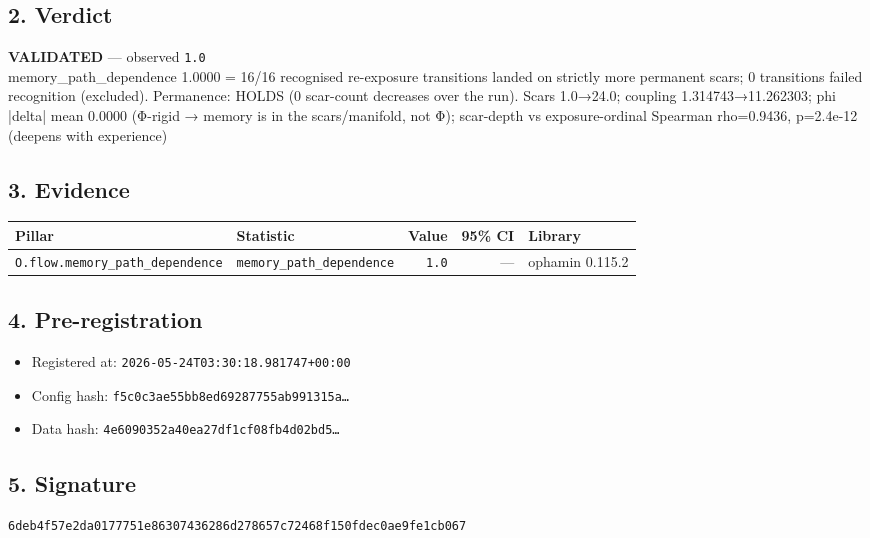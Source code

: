 \documentclass{article}
\begin{document}
\subsection*{2. Verdict}
\textcolor{validated}{\textbf{VALIDATED}} --- observed \texttt{1.0}\\
memory\_path\_dependence 1.0000 = 16/16 recognised re-exposure transitions landed on strictly more permanent scars; 0 transitions failed recognition (excluded). Permanence: HOLDS (0 scar-count decreases over the run). Scars 1.0→24.0; coupling 1.314743→11.262303; phi |delta| mean 0.0000 (Φ-rigid → memory is in the scars/manifold, not Φ); scar-depth vs exposure-ordinal Spearman rho=0.9436, p=2.4e-12 (deepens with experience)
\subsection*{3. Evidence}
\begin{tabular}{llrrl}\toprule
\textbf{Pillar} & \textbf{Statistic} & \textbf{Value} & \textbf{95\% CI} & \textbf{Library} \\\midrule
\texttt{O.flow.memory\_path\_dependence} & \texttt{memory\_path\_dependence} & \texttt{1.0} & --- & ophamin 0.115.2 \\
\bottomrule\end{tabular}
\subsection*{4. Pre-registration}
\begin{itemize}
\item Registered at: \texttt{2026-05-24T03:30:18.981747+00:00}
\item Config hash: \texttt{f5c0c3ae55bb8ed69287755ab991315a\dots}
\item Data hash: \texttt{4e6090352a40ea27df1cf08fb4d02bd5\dots}
\end{itemize}
\subsection*{5. Signature}
\texttt{6deb4f57e2da0177751e86307436286d278657c72468f150fdec0ae9fe1cb067}\\
\end{document}
